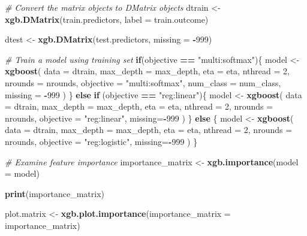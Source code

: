\documentclass[]{book}
\newenvironment{Shaded}{\begin{snugshade}}{\end{snugshade}}
\newcommand{\KeywordTok}[1]{\textcolor[rgb]{0.13,0.29,0.53}{\textbf{#1}}}
\newcommand{\DataTypeTok}[1]{\textcolor[rgb]{0.13,0.29,0.53}{#1}}
\newcommand{\DecValTok}[1]{\textcolor[rgb]{0.00,0.00,0.81}{#1}}
\newcommand{\StringTok}[1]{\textcolor[rgb]{0.31,0.60,0.02}{#1}}
\newcommand{\CommentTok}[1]{\textcolor[rgb]{0.56,0.35,0.01}{\textit{#1}}}
\newcommand{\ControlFlowTok}[1]{\textcolor[rgb]{0.13,0.29,0.53}{\textbf{#1}}}
\newcommand{\OperatorTok}[1]{\textcolor[rgb]{0.81,0.36,0.00}{\textbf{#1}}}
\newcommand{\NormalTok}[1]{#1}
\begin{document}
\begin{Shaded}
\begin{Highlighting}[]
  \CommentTok{# Convert the matrix objects to DMatrix objects}
\NormalTok{  dtrain <-}\StringTok{ }\KeywordTok{xgb.DMatrix}\NormalTok{(train.predictors, }\DataTypeTok{label =}\NormalTok{ train.outcome)}
  
\NormalTok{  dtest <-}\StringTok{ }\KeywordTok{xgb.DMatrix}\NormalTok{(test.predictors, }\DataTypeTok{missing =} \OperatorTok{-}\DecValTok{999}\NormalTok{)}
  
  \CommentTok{# Train a model using training set}
  \ControlFlowTok{if}\NormalTok{(objective }\OperatorTok{==}\StringTok{ "multi:softmax"}\NormalTok{)\{}
\NormalTok{    model <-}\StringTok{ }\KeywordTok{xgboost}\NormalTok{(}
      \DataTypeTok{data =}\NormalTok{ dtrain, }\DataTypeTok{max_depth =}\NormalTok{ max_depth, }\DataTypeTok{eta =}\NormalTok{ eta, }\DataTypeTok{nthread =} \DecValTok{2}\NormalTok{, }\DataTypeTok{nrounds =}\NormalTok{ nrounds,}
      \DataTypeTok{objective =} \StringTok{"multi:softmax"}\NormalTok{, }\DataTypeTok{num_class =}\NormalTok{ num_class, }\DataTypeTok{missing =} \OperatorTok{-}\DecValTok{999}
\NormalTok{    )}
\NormalTok{  \} }\ControlFlowTok{else} \ControlFlowTok{if}\NormalTok{ (objective }\OperatorTok{==}\StringTok{ "reg:linear"}\NormalTok{)\{}
\NormalTok{    model <-}\StringTok{ }\KeywordTok{xgboost}\NormalTok{(}
      \DataTypeTok{data =}\NormalTok{ dtrain, }\DataTypeTok{max_depth =}\NormalTok{ max_depth, }\DataTypeTok{eta =}\NormalTok{ eta, }\DataTypeTok{nthread =} \DecValTok{2}\NormalTok{, }\DataTypeTok{nrounds =}\NormalTok{ nrounds,}
      \DataTypeTok{objective =} \StringTok{"reg:linear"}\NormalTok{, }\DataTypeTok{missing=}\OperatorTok{-}\DecValTok{999}
\NormalTok{    )}
\NormalTok{  \} }\ControlFlowTok{else}\NormalTok{ \{}
\NormalTok{    model <-}\StringTok{ }\KeywordTok{xgboost}\NormalTok{(}
      \DataTypeTok{data =}\NormalTok{ dtrain, }\DataTypeTok{max_depth =}\NormalTok{ max_depth, }\DataTypeTok{eta =}\NormalTok{ eta, }\DataTypeTok{nthread =} \DecValTok{2}\NormalTok{, }\DataTypeTok{nrounds =}\NormalTok{ nrounds,}
      \DataTypeTok{objective =} \StringTok{"reg:logistic"}\NormalTok{, }\DataTypeTok{missing=}\OperatorTok{-}\DecValTok{999}
\NormalTok{    )}
\NormalTok{  \}}

  \CommentTok{# Examine feature importance}
\NormalTok{  importance_matrix <-}\StringTok{ }\KeywordTok{xgb.importance}\NormalTok{(}\DataTypeTok{model =}\NormalTok{ model)}
  
  \KeywordTok{print}\NormalTok{(importance_matrix)}
  
\NormalTok{  plot.matrix <-}\StringTok{ }\KeywordTok{xgb.plot.importance}\NormalTok{(}\DataTypeTok{importance_matrix =}\NormalTok{ importance_matrix)}
  

\end{Highlighting}
\end{Shaded}
\end{document}
